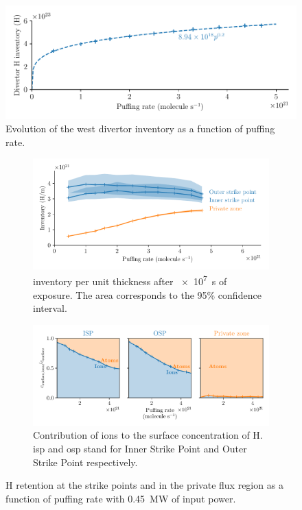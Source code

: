 \begin{figure}[h]
    \centering
    \includegraphics[width=\linewidth]{Figures/Chapter4/WEST/inventory_vs_puffing_rate.pdf}
    \caption{Evolution of the \gls{west} \gls{divertor} \gls{inventory} as a function of puffing rate.}
\end{figure}

\begin{figure}[h!]
    \centering
    \begin{subfigure}{\linewidth}
        \includegraphics[width=\linewidth]{Figures/Chapter4/WEST/inventory_at_sp_and_private_zone.pdf}
        \caption{\Gls{inventory} per unit thickness after \SI{e7}{s} of exposure. The area corresponds to the 95\% confidence interval.}
    \end{subfigure}
    \begin{subfigure}{\linewidth}
        \includegraphics[width=\linewidth]{Figures/Chapter4/WEST/ion_ratio_at_sp_and_private_zone.pdf}
        \caption{Contribution of ions to the surface concentration of H. \gls{isp} and \gls{osp} stand for Inner Strike Point and Outer Strike Point respectively.}
    \end{subfigure}%
    \caption{H \gls{retention} at the \glspl{strike point} and in the \gls{private flux region} as a function of puffing rate with \SI{0.45}{MW} of input power.}
\end{figure}

